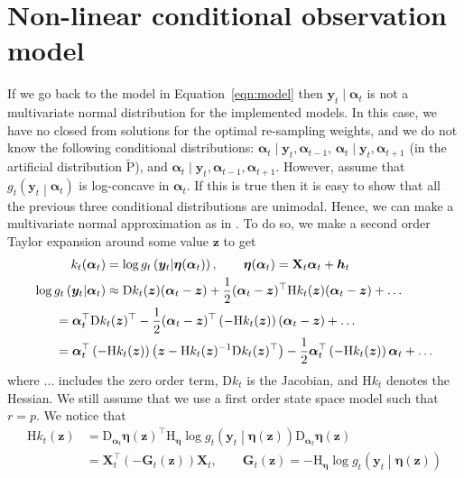 \documentclass[notitlepage]{article}
\renewcommand{\vec}[1]{\bm{#1}}
\newcommand{\mat}[1]{\mathbf{#1}}
\newcommand{\Lparen}[1]{\left( #1\right)}
\newcommand{\Cond}[2]{ #1 \middle\vert  #2}
\newcommand{\Prob}{\text{P}}
\newcommand{\optor}[2]{#1\Lparen{#2}}
\newcommand{\optorC}[3]{\optor{#1}{\Cond{#2}{#3}}}
\newcommand{\dimState}{p}
\newcommand{\dimRng}{r}
\newcommand\Jaco{\mathrm D}
\newcommand\Hess{\mathrm H}
\begin{document}
\section{Non-linear conditional observation model}
If we go back to the model in Equation~\eqref{eqn:model} then $\vec y_t
\mid \vec\alpha_t$ is not a multivariate normal distribution for the 
implemented models.   
In this case, we have no closed from solutions
for the optimal re-sampling weights, and we do not know the following conditional 
distributions: $\vec\alpha_t \mid \vec y_t, \vec\alpha_{t-1}$, 
$\vec\alpha_t \mid \vec y_t, \vec\alpha_{t+1}$ (in the artificial 
distribution $\widetilde{\Prob}$), and 
$\vec\alpha_t \mid \vec y_t, \vec\alpha_{t-1}, \vec\alpha_{t+1}$. 
However, assume that $\optorC{g_t}{\vec{y}_t}{\vec{\alpha}_t}$ 
is log-concave in $\vec{\alpha}_t$. If this is true then it is easy 
to show that all the previous three conditional distributions are 
unimodal. Hence, we can make a multivariate normal approximation as in \cite{pitt99}. To do so, we
 make a second order Taylor expansion around some value $\vec z$ 
to get%
%
\begin{align*}
k_t(\vec\alpha_t) &= \log\optorC{g_t}{\vec y_t}{\vec\eta(\vec\alpha_t)}, 
	\qquad \vec\eta(\vec\alpha_t) = \mat{X}_t\vec{\alpha}_t + \vec h_t \\
\log\optorC{g_t}{\vec{y}_t}{\vec\alpha_t}&\approx
	\Jaco k_t(\vec z) (\vec\alpha_t - \vec z) 
	+  \frac 12(\vec\alpha_t - \vec z)^\top
	\Hess k_t(\vec z)
	(\vec\alpha_t - \vec z) + \dots \\
&\hspace{-40pt}= \vec\alpha_t^\top \Jaco k_t(\vec z)^\top -
	\frac 12(\vec\alpha_t - \vec z)^\top
	\Lparen{-\Hess k_t(\vec z)}
	(\vec\alpha_t - \vec z) + \dots \\
&\hspace{-40pt}= \vec\alpha_t^\top\Lparen{-\Hess k_t(\vec z)}\Lparen{
	\vec z - \Hess k_t(\vec z)^{-1}\Jaco k_t(\vec z)^\top} 
	- \frac 12 \vec\alpha_t^\top\Lparen{-\Hess k_t(\vec z)}\vec\alpha_t + \dots
\end{align*}%
%
where $\dots$ includes the zero order term, $\Jaco k_t$ is the Jacobian,
and $\Hess k_t$ denotes the Hessian. We still assume that we use a first 
order state space model such that $\dimRng = \dimState$. We notice that %
%
\begin{align*}
\Hess k_t(\vec z) &= 
	\Jaco_{\vec\alpha_t}\vec\eta(\vec z)^\top
	\Hess_{\vec\eta}\log\optorC{g_t}{\vec y_t}{\vec\eta(\vec z)}
	\Jaco_{\vec\alpha_t}\vec\eta(\vec z) \\
	&=\mat X_t^\top(-\mat G_t(\vec z))\mat X_t, \qquad 
	\mat G_t(\vec z) = -\Hess_{\vec\eta}\log\optorC{g_t}{\vec y_t}{\vec\eta(\vec z)}
\end{align*}%
\end{document}
